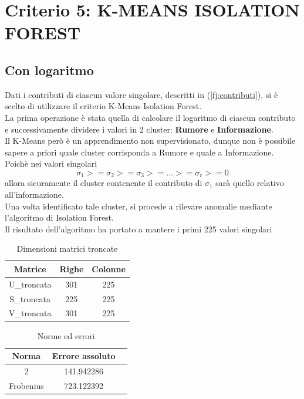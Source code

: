 \section{Criterio 5: K-MEANS ISOLATION FOREST}

\subsection{Con logaritmo}

Dati i contributi di ciascun valore singolare, descritti in (\ref{fj:contributi}), si è scelto di utilizzare il criterio K-Means Isolation Forest.\\
La prima operazione è stata quella di calcolare il logaritmo di ciascun contributo e successivamente dividere i valori in 2 cluster: \textbf{Rumore} e \textbf{Informazione}.\\
Il K-Means però è un apprendimento non supervisionato, dunque non è possibile sapere a priori quale cluster corrisponda a Rumore e quale a Informazione.\\
Poichè nei valori singolari
\begin{equation}
    \sigma_1 >= \sigma_2 >= \sigma_3 >= ... >= \sigma_r>=0
\end{equation}
allora sicuramente il cluster contenente il contributo di $\sigma_1$ sarà quello relativo all'informazione.\\
Una volta identificato tale cluster, si procede a rilevare anomalie mediante l'algoritmo di Isolation Forest.\\

\noindent Il risultato dell'algoritmo ha portato a mantere i primi 225 valori singolari
 \begin{table}[H]
    \centering
    \begin{tabular}{|c|c|c|}
        \hline
        \textbf{Matrice} & \textbf{Righe} & \textbf{Colonne} \\
        \hline
        U\_troncata & 301 & 225 \\
        \hline
        S\_troncata & 225 & 225 \\
        \hline
        V\_troncata & 301 & 225 \\
        \hline
    \end{tabular}
    \caption{Dimensioni matrici troncate}
\end{table}

\begin{table}[H]
    \centering
    \begin{tabular}{|c|c|c|}
        \hline
        \textbf{Norma} & \textbf{Errore assoluto} \\
        \hline
        2 & 141.942286  \\
        \hline
        Frobenius & 723.122392 \\
        \hline
    \end{tabular}
    \caption{Norme ed errori}
\end{table}


